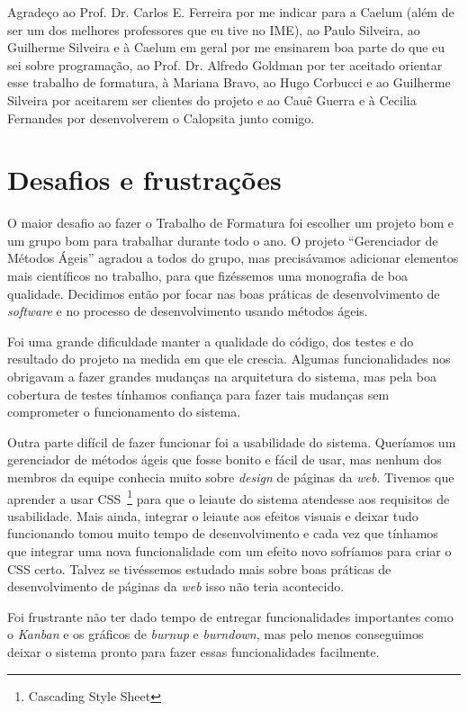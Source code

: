 \documentclass[titlepage,a4paper]{article}
\newcommand{\software}{\textit{software}}
\newcommand{\calopsita}{Calopsita}
\begin{document}
Agradeço ao Prof. Dr. Carlos E. Ferreira por me indicar para a Caelum (além de ser um dos melhores professores que eu tive no IME), ao Paulo Silveira, ao Guilherme Silveira e à Caelum em geral por me ensinarem boa parte do que eu sei sobre programação, ao Prof. Dr. Alfredo Goldman por ter aceitado orientar esse trabalho de formatura, à Mariana Bravo, ao Hugo Corbucci e ao Guilherme Silveira por aceitarem ser clientes do projeto e ao Cauê Guerra e à Cecilia Fernandes por desenvolverem o \calopsita{} junto comigo.

\section{Desafios e frustrações}

O maior desafio ao fazer o Trabalho de Formatura foi escolher um projeto bom e um grupo bom para trabalhar durante todo o ano. O projeto ``Gerenciador de Métodos Ágeis'' agradou a todos do grupo, mas precisávamos adicionar elementos mais científicos no trabalho, para que fizéssemos uma monografia de boa qualidade. Decidimos então por focar nas boas práticas de desenvolvimento de \software{} e no processo de desenvolvimento usando métodos ágeis.

Foi uma grande dificuldade manter a qualidade do código, dos testes e do resultado do projeto na medida em que ele crescia. Algumas funcionalidades nos obrigavam a fazer grandes mudanças na arquitetura do sistema, mas pela boa cobertura de testes tínhamos confiança para fazer tais mudanças sem comprometer o funcionamento do sistema.

Outra parte difícil de fazer funcionar foi a usabilidade do sistema. Queríamos um gerenciador de métodos ágeis que fosse bonito e fácil de usar, mas nenhum dos membros da equipe conhecia muito sobre \textit{design} de páginas da \textit{web}. Tivemos que aprender a usar CSS~\footnote{Cascading Style Sheet} para que o leiaute do sistema atendesse aos requisitos de usabilidade. Mais ainda, integrar o leiaute aos efeitos visuais e deixar tudo funcionando tomou muito tempo de desenvolvimento e cada vez que tínhamos que integrar uma nova funcionalidade com um efeito novo sofríamos para criar o CSS certo. Talvez se tivéssemos estudado mais sobre boas práticas de desenvolvimento de páginas da \textit{web} isso não teria acontecido.

Foi frustrante não ter dado tempo de entregar funcionalidades importantes como o \textit{Kanban} e os gráficos de \textit{burnup} e \textit{burndown}, mas pelo menos conseguimos deixar o sistema pronto para fazer essas funcionalidades facilmente.
\end{document}
